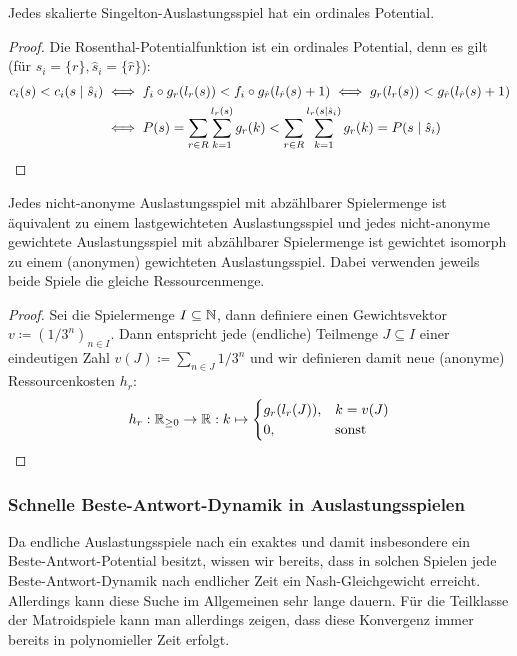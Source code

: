 \begin{satz}
	Jedes skalierte Singelton-Auslastungsspiel hat ein ordinales Potential.
\end{satz}

\begin{proof}
	Die Rosenthal-Potentialfunktion ist ein ordinales Potential, denn es gilt (für $s_i = \{r\}, \hat{s}_i = \{\hat{r}\}$):
	\begin{align*}
		c_i(s) < c_i(s \mid \hat{s}_i) &\iff f_i\circ g_r(l_r(s)) < f_i\circ g_{\hat{r}}(l_{\hat{r}}(s)+1) \iff g_r(l_r(s)) < g_{\hat{r}}(l_{\hat{r}}(s)+1) \\
										&\iff P(s) = \sum_{r \in R}\sum_{k=1}^{l_r(s)} g_r(k) < \sum_{r \in R}\sum_{k=1}^{l_r(s\mid \hat{s}_i)} g_r(k) = P(s\mid \hat{s}_i) \qedhere
	\end{align*}
\end{proof}

\begin{satz}
	Jedes nicht-anonyme Auslastungsspiel mit abzählbarer Spielermenge ist äquivalent zu einem lastgewichteten Auslastungsspiel und jedes nicht-anonyme gewichtete Auslastungsspiel mit abzählbarer Spielermenge ist gewichtet isomorph zu einem (anonymen) gewichteten Auslastungsspiel. Dabei verwenden jeweils beide Spiele die gleiche Ressourcenmenge.
\end{satz}

\begin{proof}
	Sei die Spielermenge $I \subseteq \mathbb{N}$, dann definiere einen Gewichtsvektor $v \coloneqq (1/3^n)_{n \in I}$. Dann entspricht jede (endliche) Teilmenge $J \subseteq I$ einer eindeutigen Zahl $v(J) \coloneqq \sum_{n \in J} 1/3^n$ und wir definieren damit neue (anonyme) Ressourcenkosten $h_r$:
	\[h_r: \mathbb{R}_{\geq 0} \to \mathbb{R}: k \mapsto \begin{cases}
	g_r(l_r(J)), 	&k = v(J) \\
	0,				&\text{sonst}
	\end{cases} \]
\end{proof}



\subsubsection{Schnelle Beste-Antwort-Dynamik in Auslastungsspielen}

Da endliche Auslastungsspiele nach  ein exaktes und damit insbesondere ein Beste-Antwort-Potential besitzt, wissen wir bereits, dass in solchen Spielen jede Beste-Antwort-Dynamik nach endlicher Zeit ein Nash-Gleichgewicht erreicht. Allerdings kann diese Suche im Allgemeinen sehr lange dauern. Für die Teilklasse der Matroidspiele kann man allerdings zeigen, dass diese Konvergenz immer bereits in polynomieller Zeit erfolgt.

